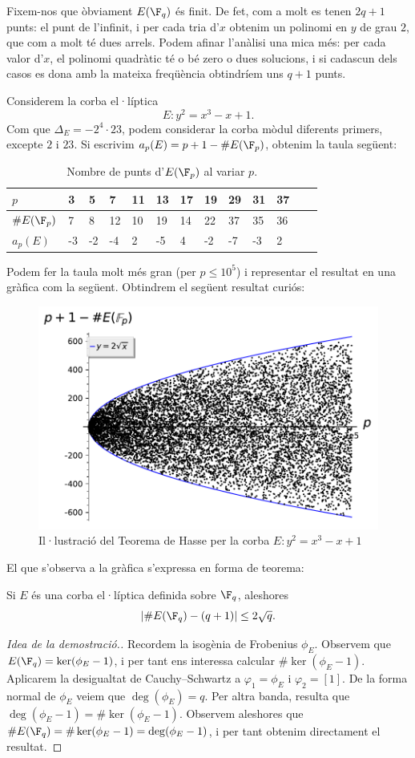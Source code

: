 Fixem-nos que òbviament $E(\F_q)$ és finit. De fet, com a molt es tenen $2q+1$ punts: el punt de l'infinit, i per cada tria d'$x$ obtenim un polinomi en $y$ de grau $2$, que com a molt té dues arrels. Podem afinar l'anàlisi una mica més: per cada valor d'$x$, el polinomi quadràtic té o bé zero o dues solucions, i si cadascun dels casos es dona amb la mateixa freqüència obtindríem uns $q+1$ punts.

\begin{example}
Considerem la corba el·líptica
\[
E\colon y^2=x^3-x+1.
\]
Com que $\Delta_E = - 2^4\cdot 23$, podem considerar la corba mòdul diferents primers, excepte $2$ i $23$. Si escrivim $a_p(E)=p+1-\#E(\F_p)$, obtenim la taula següent:
\begin{table}[ht!]
\centering
    \begin{tabular}{lllllllllllll}
\toprule
      $p$&3&5&7&11&13&17&19&29&31&37  \\
\midrule
      $\#E(\F_p)$&7&8&12&10&19&14&22&37&35&36\\
    $a_p(E)$&-3&-2&-4&2&-5&4&-2&-7&-3&2\\
    \bottomrule
    \end{tabular}
\caption{Nombre de punts d'$E(\F_p)$ al variar $p$.}
    \end{table}
\FloatBarrier
Podem fer la taula molt més gran (per $p\leq 10^5$) i representar el resultat en una gràfica com la següent. Obtindrem el següent resultat curiós:
\begin{figure}[ht!]
\centering
\includegraphics[width=.7\textwidth]{pointcounts.pdf}
\caption{Il·lustració del Teorema de Hasse per la corba $E\colon y^2=x^3-x+1$}
\end{figure}
\FloatBarrier
\end{example}
El que s'observa a la gràfica s'expressa en forma de teorema:
\begin{theorem}
 Si $E$ és una corba el·líptica definida sobre $\F_q$, aleshores
 \[
 |\# E(\F_q) - (q+1)|\leq 2\sqrt{q}.
 \]
\end{theorem}
\begin{proof}[Idea de la demostració.]
Recordem la isogènia de Frobenius $\phi_E$. Observem que $E(\F_q)=\ker(\phi_E-1)$, i per tant ens interessa calcular $\#\ker(\phi_E-1)$. Aplicarem la desigualtat de Cauchy--Schwartz a $\varphi_1=\phi_E$ i $\varphi_2=[1]$. De la forma normal de $\phi_E$ veiem que $\deg(\phi_E)=q$. Per altra banda, resulta que $\deg(\phi_E-1)=\#\ker(\phi_E-1)$. Observem aleshores que $\#E(\F_q)=\#\ker(\phi_E-1)=\deg(\phi_E-1)$, i per tant obtenim directament el resultat.
\end{proof}


